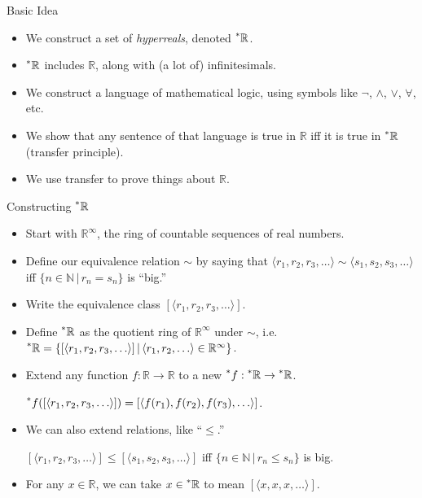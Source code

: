 \documentclass{beamer}
\theoremstyle{plain}
\theoremstyle{definition}
\newcommand{\sthat}{\,|\,}
\newcommand{\reals}{\mathbb{R}}
\newcommand{\hreals}{\prescript{*}{}{\mathbb{R}}}
\newcommand{\nats}{\mathbb{N}}
\newcommand{\hr}[1]{\prescript{*}{}{#1}}
\begin{document}
\begin{frame}{Basic Idea}
\begin{itemize}
\setlength{\itemsep}{8pt}
	\item We construct a set of \textit{hyperreals}, denoted $\hreals$.
	\item $\hreals$ includes $\reals$, along with (a lot of) infinitesimals.
	\item We construct a language of mathematical logic, using symbols like $\neg$, $\land$, $\lor$, $\forall$, etc.
	\item We show that any sentence of that language is true in $\reals$ iff it is true in $\hreals$ (transfer principle).
	\item We use transfer to prove things about $\reals$.
\end{itemize}
\end{frame}

\begin{frame}{Constructing $\hreals$}
\begin{itemize}
\setlength{\itemsep}{8pt}

\item Start with $\reals^\infty$, the ring of countable sequences of real numbers.

\item Define our equivalence relation $\sim$ by saying that $\langle r_1, r_2, r_3, \ldots \rangle \sim \langle s_1, s_2, s_3, \ldots \rangle$ iff $\{n \in \nats \sthat r_n = s_n \}$ is ``big.''

\item Write the equivalence class $[\langle r_1, r_2, r_3, \ldots \rangle]$.

\item Define $\hreals$ as the quotient ring of $\reals^\infty$ under $\sim$, i.e. $\hreals = \{[\langle r_1, r_2, r_3, \ldots \rangle] \sthat \langle r_1, r_2, \ldots \rangle \in \reals^\infty\}$.

\item Extend any function $f: \reals \to \reals$ to a new $\hr{f}: \hreals \to \hreals$.

$\hr{f}([\langle r_1, r_2, r_3, \ldots \rangle]) = [\langle f(r_1), f(r_2), f(r_3), \ldots \rangle]$.

\item We can also extend relations, like ``$\leq$.'' 

$[\langle r_1, r_2, r_3, \ldots \rangle] \leq [\langle s_1, s_2, s_3, \ldots \rangle]$ iff $\{n \in \nats \sthat r_n \leq s_n\}$ is big.

\item For any $x \in \reals$, we can take $x \in \hreals$ to mean $[\langle x, x, x, \ldots \rangle]$.
\end{itemize}
\end{frame}
\end{document}
